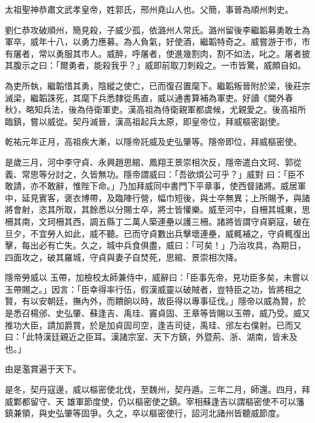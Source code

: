 
\begin{pinyinscope}

 太祖聖神恭肅文武孝皇帝，姓郭氏，邢州堯山人也。父簡，事晉為順州刺史。



 劉仁恭攻破順州，簡見殺，子威少孤，依潞州人常氏。潞州留後李繼韜募勇敢士為軍卒，威年十八，以勇力應募。為人負氣，好使酒，繼韜特奇之。威嘗游于市，市有屠者，常以勇服其市人。威醉，呼屠者，使進幾割肉，割不如法，叱之。屠者披其腹示之曰：「爾勇者，能殺我乎？」威即前取刀刺殺之。一市皆驚，威頗自如。



 為吏所執，繼韜惜其勇，陰縱之使亡，已而復召置麾下。繼韜叛晉附於梁，後莊宗滅梁，繼韜誅死，其麾下兵悉隸從馬直，威以通書算補為軍吏。好讀《閫外春秋》，略知兵法，後為侍衛軍吏。漢高祖為侍衛親軍都虞候，尤親愛之。後高祖所臨鎮，嘗以威從。契丹滅晉，漢高祖起兵太原，即皇帝位，拜威樞密副使。



 乾祐元年正月，高祖疾大漸，以隱帝託威及史弘肇等。隱帝即位，拜威樞密使。



 是歲三月，河中李守貞、永興趙思綰、鳳翔王景崇相次反，隱帝遣白文珂、郭從義、常思等分討之，久皆無功。隱帝謂威曰：「吾欲煩公可乎？」威對
 曰：「臣不敢請，亦不敢辭，惟陛下命。」乃加拜威同中書門下平章事，使西督諸將。威居軍中，延見賓客，褒衣博帶，及臨陣行營，幅巾短後，與士卒無異；上所賜予，與諸將會射，恣其所取，其餘悉以分賜士卒，將士皆懽樂。威至河中，自柵其城東，思柵其南，文珂柵其西，調五縣丁二萬人築連壘以護三柵。諸將皆謂守貞窮寇，破在旦夕，不宜勞人如此，威不聽。已而守貞數出兵擊壞連壘，威輒補之，守貞輒復出擊，每出必有亡失。久之，城中兵食俱盡，威曰：「可矣！」乃治攻具，為期日，四面攻之，破其羅城，守貞與妻子自焚死，思綰、景崇相次降。



 隱帝勞威以
 玉帶，加檢校太師兼侍中，威辭曰：「臣事先帝，見功臣多矣，未嘗以玉帶賜之。」因言：「臣幸得率行伍，假漢威靈以破賊者，豈特臣之功，皆將相之賢，有以安朝廷，撫內外，而饋餉以時，故臣得以專事征伐。」隱帝以威為賢，於是悉召楊邠、史弘肇、蘇逢吉、禹珪、竇貞固、王章等皆賜以玉帶，威乃受。威又推功大臣，請加爵賞，於是加貞固司空，逢吉司徒，禹珪、邠左右僕射。已而又曰：「此特漢廷親近之臣耳。漢諸宗室、天下方鎮，外暨荊、浙、湖南，皆未及也。」



 由是濫賞遍于天下。



 是冬，契丹寇邊，威以樞密使北伐，至魏州，契丹遁。三年二月，師還。四月，拜威鄴都留守、天
 雄軍節度使，仍以樞密使之鎮。宰相蘇逢吉以謂樞密使不可以籓鎮兼領，與史弘肇等固爭。久之，卒以樞密使行，詔河北諸州皆聽威節度。




\end{pinyinscope}
